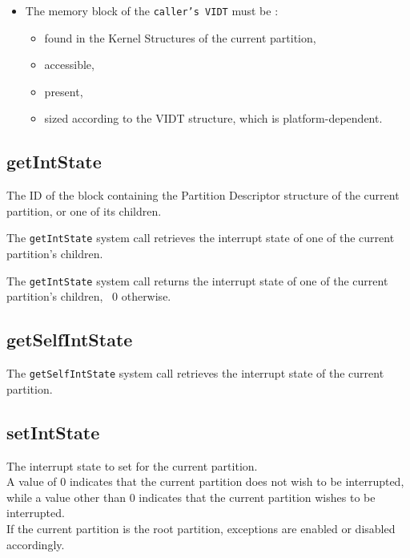 \documentclass[10pt,a4paper,titlepage]{refart}
\begin{document}
\begin{itemize}
\begin{itemize}
        \item accessible,
        \item present,
        \item writable,
        \item sized according to the execution context to save.
    \end{itemize}
    Moreover, this memory block must start on an aligned address according to the platform.
    \item The memory block of the \texttt{caller's VIDT} must be :
    \begin{itemize}
        \item found in the Kernel Structures of the current partition,
        \item accessible,
        \item present,
        \item sized according to the VIDT structure, which is platform-dependent.
    \end{itemize}

\end{itemize}

\subsection{getIntState}
The ID of the block containing the Partition Descriptor structure of the current partition, or one of its children.

\medskip
The \texttt{getIntState} system call retrieves the interrupt state of one of the current partition's children.

The \texttt{getIntState} system call returns the interrupt state of one of the current partition's children, ~0 otherwise.

\subsection{getSelfIntState}
The \texttt{getSelfIntState} system call retrieves the interrupt state of the current partition.

\subsection{setIntState}
The interrupt state to set for the current partition.\\
A value of 0 indicates that the current partition does not wish to be interrupted, while a value other than 0
indicates that the current partition wishes to be interrupted.\\
If the current partition is the root partition, exceptions are enabled or disabled accordingly.
\end{document}
